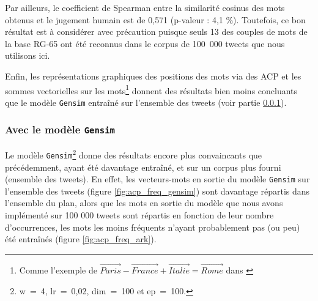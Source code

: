 \documentclass[11pt,french,french]{article}
\let\rmarkdownfootnote\footnote%
\def\footnote{\protect\rmarkdownfootnote}
\begin{document}
Par ailleurs, le coefficient de Spearman entre la similarité cosinus des mots obtenus et le jugement humain est de 0,571 (p-valeur : 4,1 \%). Toutefois, ce bon résultat est à considérer avec précaution puisque seuls 13 des couples de mots de la base RG-65 ont été reconnus dans le corpus de 100~000 tweets que nous utilisons ici.

Enfin, les représentations graphiques des positions des mots via des ACP et les sommes vectorielles sur les mots\footnote{Comme l'exemple de \(\overrightarrow{Paris} - \overrightarrow{France} + \overrightarrow{Italie} = \overrightarrow{Rome}\) dans \cite{Mikolov}} donnent des résultats bien moins concluants que le modèle \texttt{Gensim} entraîné sur l'ensemble des tweets (voir partie \ref{sec:gensimresultats}).

\hypertarget{sec:gensimresultats}{%
\subsubsection{\texorpdfstring{Avec le modèle \texttt{Gensim}}{Avec le modèle Gensim}}\label{sec:gensimresultats}}

Le modèle \texttt{Gensim}\footnote{w~=~4, lr~=~0,02, dim~=~100 et ep~=~100.} donne des résultats encore plus convaincants que précédemment, ayant été davantage entraîné, et sur un corpus plus fourni (ensemble des tweets).
En effet, les vecteurs-mots en sortie du modèle \texttt{Gensim} sur l'ensemble des tweets (figure \ref{fig:acp_freq_gensim}) sont davantage répartis dans l'ensemble du plan, alors que les mots en sortie du modèle que nous avons implémenté sur 100 000 tweets sont répartis en fonction de leur nombre d'occurrences, les mots les moins fréquents n'ayant probablement pas (ou peu) été entraînés (figure \ref{fig:acp_freq_ark}).
\end{document}
